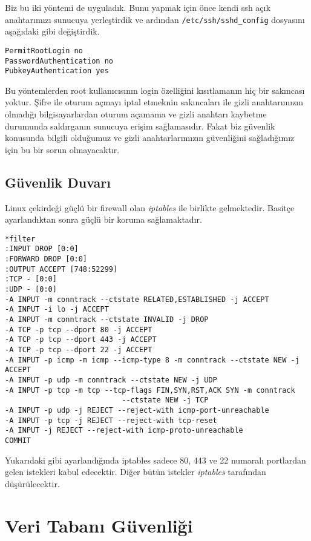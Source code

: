 \documentclass[11pt]{report}
\begin{document}
Biz bu iki yöntemi de uyguladık. Bunu yapmak için önce kendi ssh açık anahtarımızı sunucuya yerleştirdik ve ardından \texttt{/etc/ssh/sshd\_config} dosyasını aşağıdaki gibi değiştirdik.

\begin{lstlisting}[caption=OpenSSH Ayarları]
PermitRootLogin no
PasswordAuthentication no
PubkeyAuthentication yes
\end{lstlisting}

Bu yöntemlerden root kullanıcısının login özelliğini kısıtlamanın hiç bir sakıncası yoktur. Şifre ile oturum açmayı iptal etmeknin sakıncaları ile gizli anahtarımızın olmadığı bilgisayarlardan oturum açamama ve gizli anahtarı kaybetme durumunda saldırganın sunucuya erişim sağlamasıdır. Fakat biz güvenlik konusunda bilgili olduğumuz ve gizli anahtarlarımızın güvenliğini sağladığımız için bu bir sorun olmayacaktır.

\subsection{Güvenlik Duvarı}

Linux çekirdeği güçlü bir firewall olan \emph{iptables} ile birlikte gelmektedir. Basitçe ayarlandıktan sonra güçlü bir koruma sağlamaktadır.

\begin{lstlisting}[caption=IPtables Ayarları,basicstyle=\footnotesize]
*filter
:INPUT DROP [0:0]
:FORWARD DROP [0:0]
:OUTPUT ACCEPT [748:52299]
:TCP - [0:0]
:UDP - [0:0]
-A INPUT -m conntrack --ctstate RELATED,ESTABLISHED -j ACCEPT
-A INPUT -i lo -j ACCEPT
-A INPUT -m conntrack --ctstate INVALID -j DROP
-A TCP -p tcp --dport 80 -j ACCEPT
-A TCP -p tcp --dport 443 -j ACCEPT
-A TCP -p tcp --dport 22 -j ACCEPT
-A INPUT -p icmp -m icmp --icmp-type 8 -m conntrack --ctstate NEW -j ACCEPT
-A INPUT -p udp -m conntrack --ctstate NEW -j UDP
-A INPUT -p tcp -m tcp --tcp-flags FIN,SYN,RST,ACK SYN -m conntrack
                           --ctstate NEW -j TCP
-A INPUT -p udp -j REJECT --reject-with icmp-port-unreachable
-A INPUT -p tcp -j REJECT --reject-with tcp-reset
-A INPUT -j REJECT --reject-with icmp-proto-unreachable
COMMIT
\end{lstlisting}

Yukarıdaki gibi ayarlandığında iptables sadece 80, 443 ve 22 numaralı portlardan gelen istekleri kabul edecektir. Diğer bütün istekler \emph{iptables} tarafından düşürülecektir.

\section{Veri Tabanı Güvenliği}
\end{document}
